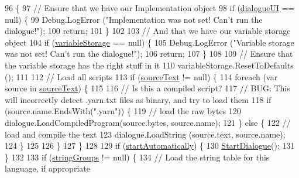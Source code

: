 \begin{DoxyCode}
96         \{
97             \textcolor{comment}{// Ensure that we have our Implementation object}
98             \textcolor{keywordflow}{if} (\hyperlink{a00071_ac87fdc65b0be57868f80c0fcd62ffd6d}{dialogueUI} == null) \{
99                 Debug.LogError (\textcolor{stringliteral}{"Implementation was not set! Can't run the dialogue!"});
100                 \textcolor{keywordflow}{return};
101             \}
102 
103             \textcolor{comment}{// And that we have our variable storage object}
104             \textcolor{keywordflow}{if} (\hyperlink{a00071_a6cca3d33f8b0ce3e750caed9fd8fc734}{variableStorage} == null) \{
105                 Debug.LogError (\textcolor{stringliteral}{"Variable storage was not set! Can't run the dialogue!"});
106                 \textcolor{keywordflow}{return};
107             \}
108 
109             \textcolor{comment}{// Ensure that the variable storage has the right stuff in it}
110             variableStorage.ResetToDefaults ();
111 
112             \textcolor{comment}{// Load all scripts}
113             \textcolor{keywordflow}{if} (\hyperlink{a00071_a71eae33d06990a3aec5d444fae017492}{sourceText} != null) \{
114                 \textcolor{keywordflow}{foreach} (var source \textcolor{keywordflow}{in} \hyperlink{a00071_a71eae33d06990a3aec5d444fae017492}{sourceText}) \{
115 
116                     \textcolor{comment}{// Is this a compiled script?}
117                     \textcolor{comment}{// BUG: This will incorrectly detect .yarn.txt files as binary, and try to load them}
118                     \textcolor{keywordflow}{if} (source.name.EndsWith(\textcolor{stringliteral}{".yarn"})) \{
119                         \textcolor{comment}{// load the raw bytes}
120                         dialogue.LoadCompiledProgram(source.bytes, source.name);
121                     \} \textcolor{keywordflow}{else} \{
122                         \textcolor{comment}{// load and compile the text}
123                         dialogue.LoadString (source.text, source.name);
124                     \}
125                     
126                 \}
127             \}
128 
129             \textcolor{keywordflow}{if} (\hyperlink{a00071_a6476a987f9788dba653976bcbe72980c}{startAutomatically}) \{
130                 \hyperlink{a00071_ab083d0ac60b41958b591c632e3c3a53e}{StartDialogue}();
131             \}
132 
133             \textcolor{keywordflow}{if} (\hyperlink{a00071_a4d00a0671c2966b88d1c806c675fe915}{stringGroups} != null) \{
134                 \textcolor{comment}{// Load the string table for this language, if appropriate}

\end{DoxyCode}
